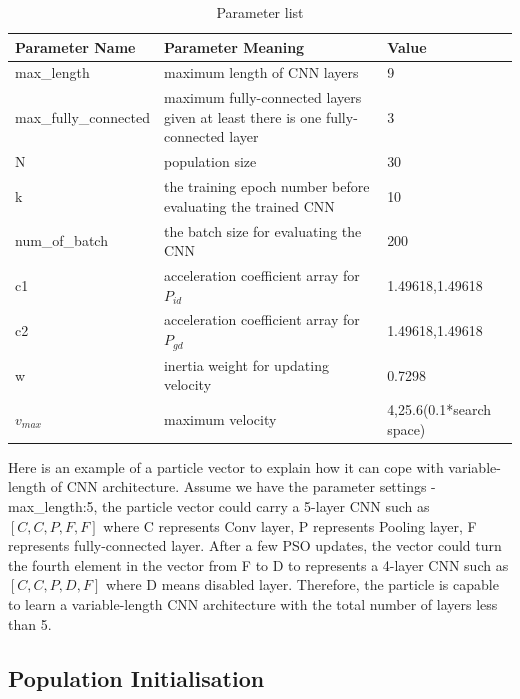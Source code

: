 \documentclass[conference]{IEEEtran}
\begin{document}
\begin{table}[!t]
	\renewcommand{\arraystretch}{1.3}
	\caption{Parameter list}
	\label{table:ParameterList}
	\centering
	\begin{tabular}{|p{2.5cm}|p{3cm}|p{2cm}|}
		\hline
		Parameter Name & Parameter Meaning & Value\\
		\hline
		max\_length & maximum length of CNN layers & 9\\
		\hline
		max\_fully\_connected & maximum fully-connected layers given at least there is one fully-connected layer & 3\\
		\hline
		N & population size & 30\\
		\hline
		k & the training epoch number before evaluating the trained CNN & 10\\
		\hline
		num\_of\_batch & the batch size for evaluating the CNN & 200\\
		\hline
		c1 & acceleration coefficient array for $P_{id}$ & 1.49618,1.49618\\
		\hline
		c2 & acceleration coefficient array for $P_{gd}$ & 1.49618,1.49618\\
		\hline
		w & inertia weight for updating velocity & 0.7298\\
		\hline
		$v_{max}$ & maximum velocity & 4,25.6(0.1*search space)\\
		\hline
	\end{tabular}
\end{table}

Here is an example of a particle vector to explain how it can cope with variable-length of CNN architecture. Assume we have the parameter settings - max\_length:5, the particle vector could carry a 5-layer CNN such as $[C, C, P, F, F]$ where C represents Conv layer, P represents Pooling layer, F represents fully-connected layer. After a few PSO updates, the vector could turn the fourth element in the vector from F to D to represents a 4-layer CNN such as $[C, C, P, D, F]$ where D means disabled layer. Therefore, the particle is capable to learn a variable-length CNN architecture with the total number of layers less than 5. 

\subsection{Population Initialisation}
\end{document}
